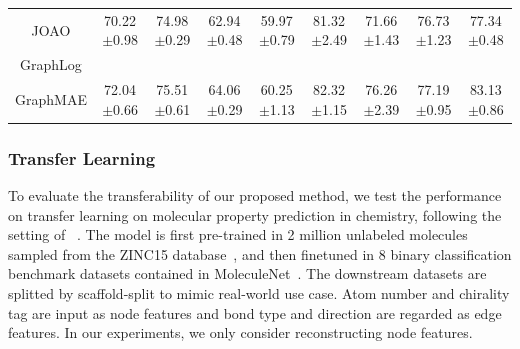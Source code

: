 {\begin{table}[htp]
\begin{tabular}{c|cccccccc}
    JOAO                & 70.22$\pm$0.98 & 74.98$\pm$0.29 & 62.94$\pm$0.48 & 59.97$\pm$0.79 & 81.32$\pm$2.49 & 71.66$\pm$1.43 & 76.73$\pm$1.23 & 77.34$\pm$0.48 \\
    GraphLog \\ 
\midrule
    GraphMAE        & 72.04$\pm$0.66 & 75.51$\pm$0.61 & 64.06$\pm$0.29 & 60.25$\pm$1.13 & 82.32$\pm$1.15 & 76.26$\pm$2.39 & 77.19$\pm$0.95 & 83.13$\pm$0.86 \\
\bottomrule[1.2pt]
\end{tabular}
\end{table}





\subsubsection{Transfer Learning}\hfill



 To evaluate the transferability of our proposed method, we test the performance on transfer learning on molecular property prediction in chemistry, following the setting of ~\cite{hu2020strategies,you2020graph,you2021graph}. The model is first pre-trained in  2 million unlabeled molecules sampled from the ZINC15 database~\cite{sterling2015zinc}, and then finetuned in 8 binary classification benchmark datasets contained in MoleculeNet~\cite{wu2018moleculenet}. The downstream datasets are splitted by scaffold-split to mimic real-world use case.  Atom number and chirality tag are input as node features and bond type and direction are regarded as edge features. In our experiments, we only consider reconstructing node features.

}
